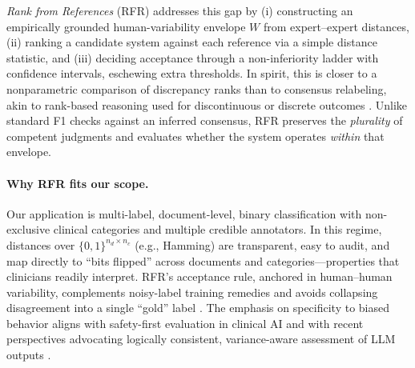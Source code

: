 \documentclass[12pt]{article}
\begin{document}
\textit{Rank from References} (RFR) addresses this gap by (i) constructing an empirically grounded human-variability envelope $W$ from expert--expert distances, (ii) ranking a candidate system against each reference via a simple distance statistic, and (iii) deciding acceptance through a non-inferiority ladder with confidence intervals, eschewing extra thresholds. In spirit, this is closer to a nonparametric comparison of discrepancy ranks than to consensus relabeling, akin to rank-based reasoning used for discontinuous or discrete outcomes \cite{conover1972}. Unlike standard F1 checks against an inferred consensus, RFR preserves the \emph{plurality} of competent judgments and evaluates whether the system operates \emph{within} that envelope.

\paragraph{Why RFR fits our scope.}
Our application is multi-label, document-level, binary classification with non-exclusive clinical categories and multiple credible annotators. In this regime, distances over $\{0,1\}^{n_d\times n_c}$ (e.g., Hamming) are transparent, easy to audit, and map directly to “bits flipped” across documents and categories—properties that clinicians readily interpret. RFR’s acceptance rule, anchored in human–human variability, complements noisy-label training remedies \cite{han2022,han2023,frenay2014} and avoids collapsing disagreement into a single “gold” label \cite{dawid1979maximum,hui1980study,chou2019,fornaciari2021}. The emphasis on specificity to biased behavior aligns with safety-first evaluation in clinical AI \cite{shojania2020} and with recent perspectives advocating logically consistent, variance-aware assessment of LLM outputs \cite{SLCA}.
\end{document}
